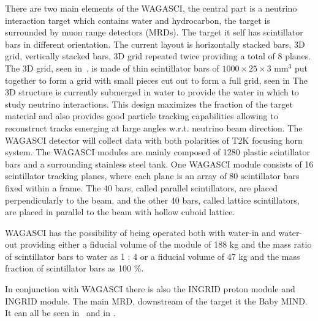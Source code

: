 There are two main elements of the WAGASCI, the central part is a neutrino interaction target which contains water and hydrocarbon, the target is surrounded by muon range detectors (MRDs). The target it self has scintillator bars in different orientation. The current layout is horizontally stacked bars, 3D grid, vertically stacked bars, 3D grid repeated twice providing a total of 8 planes. The 3D grid, seen in~, is made of thin scintillator bars of $1000\times25\times3$ mm$^3$ put together to form a grid with small pieces cut out to form a full grid, seen in The 3D structure is currently submerged in water to provide the water in which to study neutrino interactions. This design maximizes the fraction of the target material and also provides good particle tracking capabilities allowing to reconstruct tracks emerging at large angles w.r.t. neutrino beam direction. The WAGASCI detector will collect data with both polarities of T2K focusing horn system. The WAGASCI modules are mainly composed of 1280 plastic scintillator bars and a surrounding stainless steel tank. One WAGASCI module consists of 16 scintillator tracking planes, where each plane is an array of 80 scintillator bars fixed within a frame.
The 40 bars, called parallel scintillators, are placed perpendicularly to the beam, and the other 40 bars, called lattice scintillators, are placed in parallel to the beam with hollow cuboid lattice.

WAGASCI has the possibility of being operated both with water-in and water-out providing either a fiducial volume of the module of 188 kg and the mass ratio of scintillator bars to water as 1 : 4 or a fiducial volume of 47 kg and the mass fraction of scintillator bars as 100 \%.

In conjunction with WAGASCI there is also the INGRID proton module and INGRID module. The main MRD, downstream of the target it the Baby MIND. It can all be seen in~ and in . 

